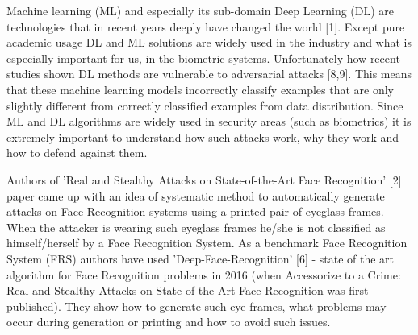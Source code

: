Machine learning (ML) and especially its sub-domain Deep Learning (DL) are technologies that in recent years deeply have changed the world [1]. Except pure academic usage DL and ML solutions are widely used in the industry and what is especially important for us, in the biometric systems. Unfortunately how recent studies shown DL methods are vulnerable to adversarial attacks [8,9]. This means that these machine learning models incorrectly classify examples that are only slightly different from correctly classified examples from data distribution. Since ML and DL algorithms are widely used in security areas (such as biometrics) it is extremely important to understand how such attacks work, why they work and how to defend against them. 

Authors of 'Real and Stealthy Attacks on State-of-the-Art Face Recognition' [2] paper came up with an idea of systematic method to automatically generate attacks on Face Recognition systems using a printed pair of eyeglass frames. When the attacker is wearing such eyeglass frames he/she is not classified as himself/herself by a Face Recognition System. As a benchmark Face Recognition System (FRS) authors have used  'Deep-Face-Recognition' [6] - state of the art algorithm for Face Recognition problems in 2016 (when Accessorize to a Crime: Real and Stealthy Attacks on State-of-the-Art Face Recognition was first published). They show how to generate such eye-frames, what problems may occur during generation or printing and how to avoid such issues.
